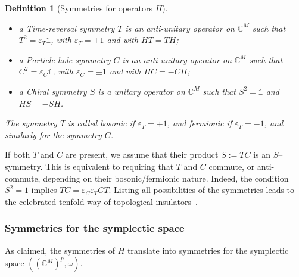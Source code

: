 \documentclass[11pt]{amsart}
\numberwithin{equation}{section} %
\newtheorem{definition}[theorem]{Definition}
\newcommand\1{{\mathds 1}}
\def\C{{\mathbb C}}
\begin{document}
\medskip

\begin{definition}[Symmetries for operators $H$] ~
    \begin{itemize}
        \item a Time-reversal symmetry $T$ is an anti-unitary operator on $\C^M$ such that $T^2=\varepsilon_T \1$, with $\varepsilon_T=\pm1$ and with $HT=TH$;
        \item a Particle-hole symmetry $C$ is an anti-unitary operator on $\C^M$ such that $C^2=\varepsilon_C \1$, with $\varepsilon_C=\pm1$ and with $HC=-CH$;
        \item a Chiral symmetry $S$ is a unitary operator on $\C^M$ such that $S^2=\1$ and $HS=-SH$.
    \end{itemize}
    The symmetry $T$ is called bosonic if $\varepsilon_T = +1$, and fermionic if $\varepsilon_T = -1$, and similarly for the symmetry $C$.
\end{definition}
If both $T$ and $C$ are present, we assume that their product $S := T C$ is an $S$--symmetry. This is equivalent to requiring that $T$ and $C$ commute, or anti-commute, depending on their bosonic/fermionic nature. Indeed, the condition $S^2=1$ implies $TC=\varepsilon_C\varepsilon_T CT$. Listing all possibilities of the symmetries leads to the celebrated tenfold way of topological insulators~\cite{RyuSchFur-10}. 

\subsubsection{Symmetries for the symplectic space}

As claimed, the symmetries of $H$ translate into symmetries for the symplectic space $((\C^M)^p, \omega)$.
\end{document}
